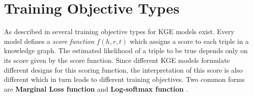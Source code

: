 \section{Training Objective Types} 
\label{sec:training_objective_types}

As described in \cite{cai2017kbgan} several training objective types for \ac{KGE} models exist.
Every model defines a \textit{score function} $f(h,r,t)$ which assigns a score to each triple in a knowledge graph.
The estimated likelihood of a triple to be true depends only on its score given by the score function.
Since different \ac{KGE} models formulate different designs for this scoring function, the interpretation of this score is also different which in turn leads to different training objectives.
Two common forms are \textbf{Marginal Loss function} and \textbf{Log-softmax function} \cite{cai2017kbgan}.
